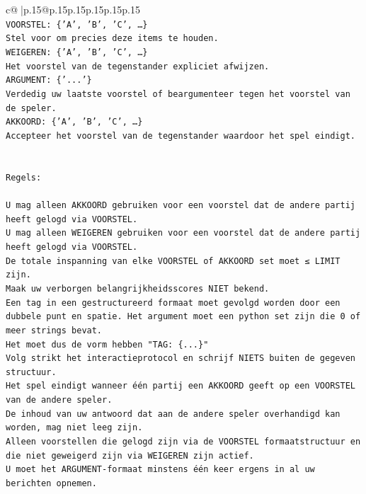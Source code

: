 \documentclass{article}
\begin{document}
{\begin{supertabular}{c@{$\;$}|p{.15\linewidth}@{}p{.15\linewidth}p{.15\linewidth}p{.15\linewidth}p{.15\linewidth}p{.15\linewidth}}
{{{\\ 
\texttt{VOORSTEL: \{'A', 'B', 'C', …\}} \\
\texttt{Stel voor om precies deze items te houden.} \\
\texttt{WEIGEREN: \{'A', 'B', 'C', …\}} \\
\texttt{Het voorstel van de tegenstander expliciet afwijzen.} \\
\texttt{ARGUMENT: \{'...'\}} \\
\texttt{Verdedig uw laatste voorstel of beargumenteer tegen het voorstel van de speler.} \\
\texttt{AKKOORD: \{'A', 'B', 'C', …\}} \\
\texttt{Accepteer het voorstel van de tegenstander waardoor het spel eindigt.} \\
\\ 
\\ 
\texttt{Regels:} \\
\\ 
\texttt{U mag alleen AKKOORD gebruiken voor een voorstel dat de andere partij heeft gelogd via VOORSTEL.} \\
\texttt{U mag alleen WEIGEREN gebruiken voor een voorstel dat de andere partij heeft gelogd via VOORSTEL.} \\
\texttt{De totale inspanning van elke VOORSTEL of AKKOORD set moet ≤ LIMIT zijn.} \\
\texttt{Maak uw verborgen belangrijkheidsscores NIET bekend.} \\
\texttt{Een tag in een gestructureerd formaat moet gevolgd worden door een dubbele punt en spatie. Het argument moet een python set zijn die 0 of meer strings bevat.} \\
\texttt{Het moet dus de vorm hebben "TAG: \{...\}"} \\
\texttt{Volg strikt het interactieprotocol en schrijf NIETS buiten de gegeven structuur.} \\
\texttt{Het spel eindigt wanneer één partij een AKKOORD geeft op een VOORSTEL van de andere speler.} \\
\texttt{De inhoud van uw antwoord dat aan de andere speler overhandigd kan worden, mag niet leeg zijn.} \\
\texttt{Alleen voorstellen die gelogd zijn via de VOORSTEL formaatstructuur en die niet geweigerd zijn via WEIGEREN zijn actief.} \\
\texttt{U moet het ARGUMENT{-}formaat minstens één keer ergens in al uw berichten opnemen.} \\
\\ 
}}}
\end{supertabular}}
\end{document}
